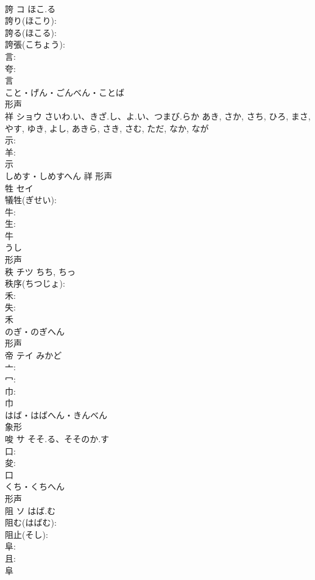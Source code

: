 \documentclass[8pt]{extreport}
\begin{document}
\begin{CJK}{UTF8}{min}
\\	誇	コ	ほこ.る		
\\	誇り(ほこり): 
\\	誇る(ほこる): 
\\	誇張(こちょう): 
\\	言: 
\\	夸: 
\\	言	
\\	こと・げん・ごんべん・ことば	
\\	形声 
\\	祥	ショウ	さいわ.い、きざ.し、よ.い、つまび.らか	あき, さか, さち, ひろ, まさ, やす, ゆき, よし, あきら, さき, さむ, ただ, なか, なが	
\\	示: 
\\	羊: 
\\	示	
\\	しめす・しめすへん	祥	形声 
\\	牲	セイ			
\\	犠牲(ぎせい): 
\\	牛: 
\\	生: 
\\	牛	
\\	うし	
\\	形声 
\\	秩	チツ		ちち, ちっ	
\\	秩序(ちつじょ): 
\\	禾: 
\\	失: 
\\	禾	
\\	のぎ・のぎへん	
\\	形声 
\\	帝	テイ	みかど		
\\	亠: 
\\	冖: 
\\	巾: 
\\	巾	
\\	はば・はばへん・きんべん	
\\	象形 
\\	唆	サ	そそ.る、そそのか.す		
\\	口: 
\\	夋: 
\\	口	
\\	くち・くちへん	
\\	形声 
\\	阻	ソ	はば.む		
\\	阻む(はばむ): 
\\	阻止(そし): 
\\	阜: 
\\	且: 
\\	阜	

\end{CJK}
\end{document}
